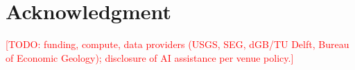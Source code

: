 \documentclass[journal]{IEEEtran}
\newcommand{\todo}[1]{\textcolor{red}{[TODO: #1]}}
\begin{document}
\section*{Acknowledgment}
\todo{funding, compute, data providers (USGS, SEG, dGB/TU Delft, Bureau of Economic Geology); disclosure of AI assistance per venue policy.}



\end{document}
